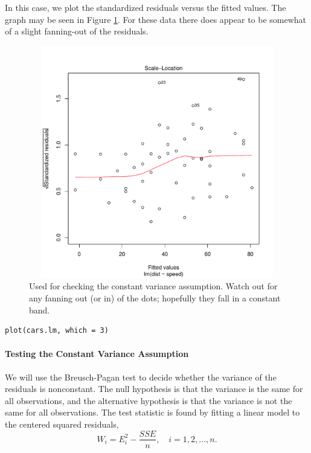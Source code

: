 \documentclass[captions=tableheading]{scrbook}
\begin{document}
In this case, we plot the standardized residuals versus the fitted values. The graph may be seen in Figure \ref{fig:std-resids-fitted-cars}. For these data there does appear to be somewhat of a slight fanning-out of the residuals.

\begin{figure}[th]
  \includegraphics[width=5in, height=4in]{img/std-resids-fitted-cars.pdf}
  \caption[Plot of standardized residuals against the fitted values for the \texttt{cars} data]{\small Used for checking the constant variance assumption. Watch out for any fanning out (or in) of the dots; hopefully they fall in a constant band.}
  \label{fig:std-resids-fitted-cars}
\end{figure}


\begin{verbatim}
plot(cars.lm, which = 3)
\end{verbatim}

\paragraph*{Testing the Constant Variance Assumption}

We will use the Breusch-Pagan test to decide whether the variance of the residuals is nonconstant. The null hypothesis is that the variance is the same for all observations, and the alternative hypothesis is that the variance is not the same for all observations. The test statistic is found by fitting a linear model to the centered squared residuals,
\begin{equation}
W_{i} = E_{i}^{2} - \frac{SSE}{n}, \quad i=1,2,\ldots,n.
\end{equation}
\end{document}
